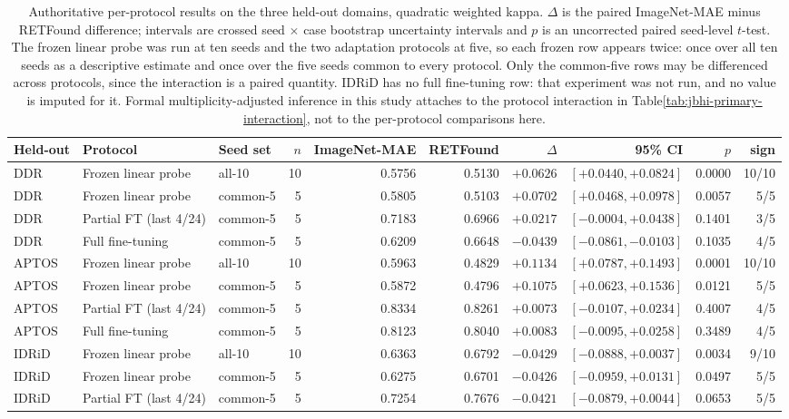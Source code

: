 \begin{table}[t]
\centering
\caption{Authoritative per-protocol results on the three held-out domains, quadratic weighted kappa. $\Delta$ is the paired ImageNet-MAE minus RETFound difference; intervals are crossed seed $\times$ case bootstrap uncertainty intervals and $p$ is an uncorrected paired seed-level $t$-test. The frozen linear probe was run at ten seeds and the two adaptation protocols at five, so each frozen row appears twice: once over all ten seeds as a descriptive estimate and once over the five seeds common to every protocol. Only the common-five rows may be differenced across protocols, since the interaction is a paired quantity. IDRiD has no full fine-tuning row: that experiment was not run, and no value is imputed for it. Formal multiplicity-adjusted inference in this study attaches to the protocol interaction in Table\~\ref{tab:jbhi-primary-interaction}, not to the per-protocol comparisons here.}
\label{tab:jbhi-master-results}
\begin{tabular}{lllrrrrrrr}
\toprule
Held-out & Protocol & Seed set & $n$ & ImageNet-MAE & RETFound & $\Delta$ & 95\% CI & $p$ & sign \\
\midrule
DDR & Frozen linear probe & all-10 & 10 & 0.5756 & 0.5130 & $+0.0626$ & $[+0.0440, +0.0824]$ & 0.0000 & 10/10 \\
DDR & Frozen linear probe & common-5 & 5 & 0.5805 & 0.5103 & $+0.0702$ & $[+0.0468, +0.0978]$ & 0.0057 & 5/5 \\
DDR & Partial FT (last 4/24) & common-5 & 5 & 0.7183 & 0.6966 & $+0.0217$ & $[-0.0004, +0.0438]$ & 0.1401 & 3/5 \\
DDR & Full fine-tuning & common-5 & 5 & 0.6209 & 0.6648 & $-0.0439$ & $[-0.0861, -0.0103]$ & 0.1035 & 4/5 \\
APTOS & Frozen linear probe & all-10 & 10 & 0.5963 & 0.4829 & $+0.1134$ & $[+0.0787, +0.1493]$ & 0.0001 & 10/10 \\
APTOS & Frozen linear probe & common-5 & 5 & 0.5872 & 0.4796 & $+0.1075$ & $[+0.0623, +0.1536]$ & 0.0121 & 5/5 \\
APTOS & Partial FT (last 4/24) & common-5 & 5 & 0.8334 & 0.8261 & $+0.0073$ & $[-0.0107, +0.0234]$ & 0.4007 & 4/5 \\
APTOS & Full fine-tuning & common-5 & 5 & 0.8123 & 0.8040 & $+0.0083$ & $[-0.0095, +0.0258]$ & 0.3489 & 4/5 \\
IDRiD & Frozen linear probe & all-10 & 10 & 0.6363 & 0.6792 & $-0.0429$ & $[-0.0888, +0.0037]$ & 0.0034 & 9/10 \\
IDRiD & Frozen linear probe & common-5 & 5 & 0.6275 & 0.6701 & $-0.0426$ & $[-0.0959, +0.0131]$ & 0.0497 & 5/5 \\
IDRiD & Partial FT (last 4/24) & common-5 & 5 & 0.7254 & 0.7676 & $-0.0421$ & $[-0.0879, +0.0044]$ & 0.0653 & 5/5 \\
\bottomrule
\end{tabular}
\end{table}
